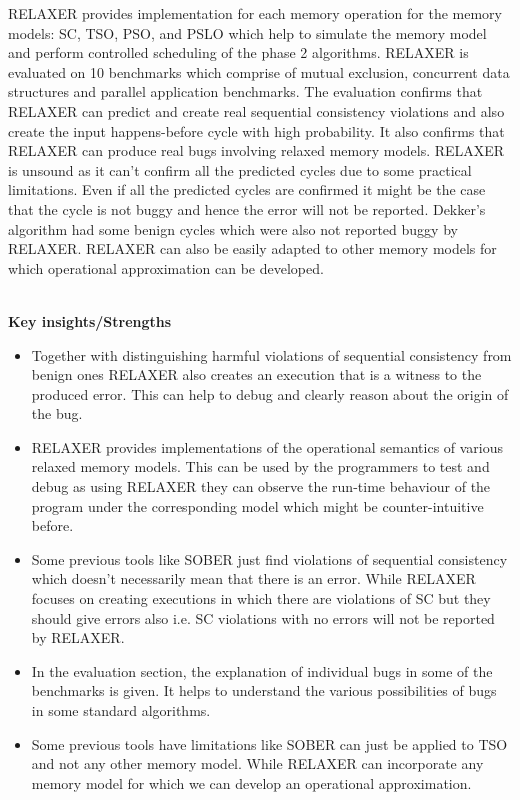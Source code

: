 \documentclass[20pt]{letter}
\begin{document}
\begin{enumerate}
{RELAXER provides implementation for each memory operation for the memory models: SC, TSO, PSO, and PSLO which help to simulate the memory model and perform controlled scheduling of the phase 2 algorithms. RELAXER is evaluated on 10 benchmarks which comprise of mutual exclusion, concurrent data structures and parallel application benchmarks. The evaluation confirms that RELAXER can predict and create real sequential consistency violations and also create the input happens-before cycle with high probability. It also confirms that RELAXER can produce real bugs involving relaxed memory models. RELAXER is unsound as it can't confirm all the predicted cycles due to some practical limitations. Even if all the predicted cycles are confirmed it might be the case that the cycle is not buggy and hence the error will not be reported. Dekker's algorithm had some benign cycles which were also not reported buggy by RELAXER. RELAXER can also be easily adapted to other memory models for which operational approximation can be developed.

\textbf{\\Key insights/Strengths}\\
\begin{itemize}
    \item Together with distinguishing harmful violations of sequential consistency from benign ones RELAXER also creates an execution that is a witness to the produced error. This can help to debug and clearly reason about the origin of the bug. 
    \item RELAXER provides implementations of the operational semantics of various relaxed memory models. This can be used by the programmers to test and debug as using RELAXER they can observe the run-time behaviour of the program under the corresponding model which might be counter-intuitive before.
    \item Some previous tools like SOBER just find violations of sequential consistency which doesn't necessarily mean that there is an error. While RELAXER focuses on creating executions in which there are violations of SC but they should give errors also i.e. SC violations with no errors will not be reported by RELAXER.
    \item In the evaluation section, the explanation of individual bugs in some of the benchmarks is given. It helps to understand the various possibilities of bugs in some standard algorithms.
    \item Some previous tools have limitations like SOBER can just be applied to TSO and not any other memory model. While RELAXER can incorporate any memory model for which we can develop an operational approximation.
\end{itemize}

}
\end{enumerate}
\end{document}
